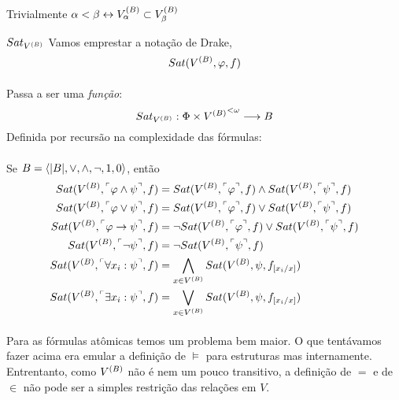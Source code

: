     \paragraph{}
        Trivialmente $\alpha<\beta\leftrightarrow V^{(B)}_\alpha\subset V^{(B)}_\beta$
    \begin{definition}{$Sat_{V^{(B)}}$}
            Vamos emprestar a notação de Drake,
        $$ Sat(V^{(B)}, \varphi, f) $$ 
        \paragraph{}
            Passa a ser uma \textit{função}:
        $$ Sat_{V^{(B)}}:\Phi\times{V^{(B)}}^{<\omega} \longrightarrow B$$
        Definida por recursão na complexidade das fórmulas:
        \paragraph{}
            Se $B = \TUPLE{|B|}{\lor}{\land}{\neg}{1}{0}$, então
        \begin{align*}
            Sat(\V{B}, \FMLA{\varphi\land\psi}, f) &=      Sat(\V{B}, \FMLA{\varphi},f) \land Sat(\V{B}, \FMLA{\psi},f)\\
            Sat(\V{B}, \FMLA{\varphi\lor\psi},  f) &=      Sat(\V{B}, \FMLA{\varphi},f) \lor  Sat(\V{B}, \FMLA{\psi},f)\\
            Sat(\V{B}, \FMLA{\varphi\rar\psi},  f) &= \neg Sat(\V{B}, \FMLA{\varphi},f) \lor  Sat(\V{B}, \FMLA{\psi},f)\\
            Sat(\V{B}, \FMLA{\neg\psi},         f) &=                                   \neg  Sat(\V{B}, \FMLA{\psi},f)\\
            Sat(\V{B}, \FMLA{\forall x_i: \psi},f) &= \bigwedge_{x\in\V{B}}                   Sat(\V{B}, \psi, f_{[x_i\slash{x}]})\\
            Sat(\V{B}, \FMLA{\exists x_i: \psi},f) &= \bigvee_{  x\in\V{B}}                   Sat(\V{B}, \psi, f_{[x_i\slash{x}]})
        \end{align*}
        \paragraph{}
            Para as fórmulas atômicas temos um problema bem maior. 
            O que tentávamos fazer acima era emular a definição 
            de $\vDash$ para estruturas mas internamente. Entrentanto, 
            como $V^{(B)}$ não é nem um pouco transitivo, a definição 
            de $=$ e de $\in$ não pode ser a simples restrição das 
            relações em $V$.

\end{definition}
